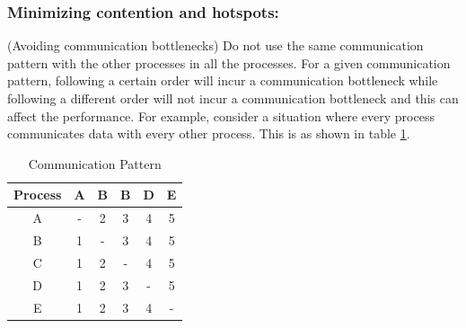 \documentclass[12pt]{book}
\begin{document}
\subsubsection{Minimizing contention and hotspots: }
(Avoiding communication bottlenecks) Do not use the same communication pattern with the other processes in all the processes.
For a given communication pattern, following a certain order will incur a communication bottleneck while following a different order will not incur a communication bottleneck and this can affect the performance.
For example, consider a situation where every process communicates data with every other process.
This is as shown in table \ref{tab:communication}.

\begin{table}[H]
    \centering
    \begin{tabular}{|c|c|c|c|c|c|}
        \hline
        Process & A & B & B & D & E \\
        \hline
        A & - & 2 & 3 & 4 & 5 \\
        B & 1 & - & 3 & 4 & 5 \\
        C & 1 & 2 & - & 4 & 5 \\
        D & 1 & 2 & 3 & - & 5 \\
        E & 1 & 2 & 3 & 4 & - \\
        \hline
    \end{tabular}
    \caption{Communication Pattern}
    \label{tab:communication}
\end{table}
\end{document}
